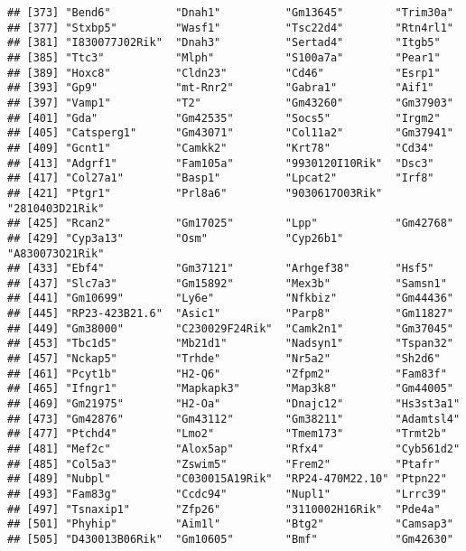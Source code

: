 \documentclass[
]{article}
\begin{document}
\begin{verbatim}
## [373] "Bend6"          "Dnah1"          "Gm13645"        "Trim30a"       
## [377] "Stxbp5"         "Wasf1"          "Tsc22d4"        "Rtn4rl1"       
## [381] "I830077J02Rik"  "Dnah3"          "Sertad4"        "Itgb5"         
## [385] "Ttc3"           "Mlph"           "S100a7a"        "Pear1"         
## [389] "Hoxc8"          "Cldn23"         "Cd46"           "Esrp1"         
## [393] "Gp9"            "mt-Rnr2"        "Gabra1"         "Aif1"          
## [397] "Vamp1"          "T2"             "Gm43260"        "Gm37903"       
## [401] "Gda"            "Gm42535"        "Socs5"          "Irgm2"         
## [405] "Catsperg1"      "Gm43071"        "Col11a2"        "Gm37941"       
## [409] "Gcnt1"          "Camkk2"         "Krt78"          "Cd34"          
## [413] "Adgrf1"         "Fam105a"        "9930120I10Rik"  "Dsc3"          
## [417] "Col27a1"        "Basp1"          "Lpcat2"         "Irf8"          
## [421] "Ptgr1"          "Prl8a6"         "9030617O03Rik"  "2810403D21Rik" 
## [425] "Rcan2"          "Gm17025"        "Lpp"            "Gm42768"       
## [429] "Cyp3a13"        "Osm"            "Cyp26b1"        "A830073O21Rik" 
## [433] "Ebf4"           "Gm37121"        "Arhgef38"       "Hsf5"          
## [437] "Slc7a3"         "Gm15892"        "Mex3b"          "Samsn1"        
## [441] "Gm10699"        "Ly6e"           "Nfkbiz"         "Gm44436"       
## [445] "RP23-423B21.6"  "Asic1"          "Parp8"          "Gm11827"       
## [449] "Gm38000"        "C230029F24Rik"  "Camk2n1"        "Gm37045"       
## [453] "Tbc1d5"         "Mb21d1"         "Nadsyn1"        "Tspan32"       
## [457] "Nckap5"         "Trhde"          "Nr5a2"          "Sh2d6"         
## [461] "Pcyt1b"         "H2-Q6"          "Zfpm2"          "Fam83f"        
## [465] "Ifngr1"         "Mapkapk3"       "Map3k8"         "Gm44005"       
## [469] "Gm21975"        "H2-Oa"          "Dnajc12"        "Hs3st3a1"      
## [473] "Gm42876"        "Gm43112"        "Gm38211"        "Adamtsl4"      
## [477] "Ptchd4"         "Lmo2"           "Tmem173"        "Trmt2b"        
## [481] "Mef2c"          "Alox5ap"        "Rfx4"           "Cyb561d2"      
## [485] "Col5a3"         "Zswim5"         "Frem2"          "Ptafr"         
## [489] "Nubpl"          "C030015A19Rik"  "RP24-470M22.10" "Ptpn22"        
## [493] "Fam83g"         "Ccdc94"         "Nupl1"          "Lrrc39"        
## [497] "Tsnaxip1"       "Zfp26"          "3110002H16Rik"  "Pde4a"         
## [501] "Phyhip"         "Aim1l"          "Btg2"           "Camsap3"       
## [505] "D430013B06Rik"  "Gm10605"        "Bmf"            "Gm42630"       

\end{verbatim}
\end{document}
